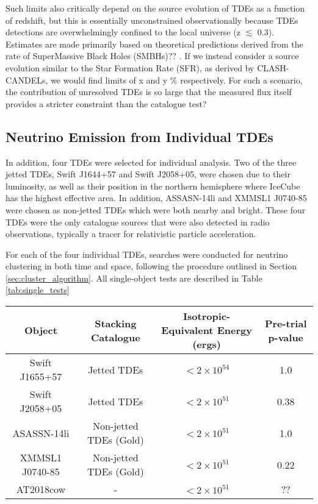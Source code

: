 Such limits also critically depend on the source evolution of TDEs as a function of redshift, but this is essentially unconstrained observationally because TDEs detections are overwhelmingly confined to the local universe (z $\lesssim$ 0.3). Estimates are made primarily based on theoretical predictions derived from the rate of SuperMassive Black Holes (SMBHs)?? \cite{Sun:2015bda}. If we instead consider a source evolution similar to the Star Formation Rate (SFR), as derived by CLASH-CANDELs, we would find limits of x and y \% respectively. For such a scenario, the contribution of unresolved TDEs is so large that the measured flux itself provides a stricter constraint than the catalogue test?

\subsection{Neutrino Emission from Individual TDEs}

In addition, four TDEs were selected for individual analysis. Two of the three jetted TDEs, Swift J1644+57 and Swift J2058+05, were chosen due to their luminosity, as well as their position in the northern hemisphere where IceCube has the highest effective area. In addition, ASSASN-14li and  XMMSL1 J0740-85 were chosen as non-jetted TDEs which were both nearby and bright. These four TDEs were the only catalogue sources that were also detected in radio observations, typically a tracer for relativistic particle acceleration.

For each of the four individual TDEs, searches were conducted for neutrino clustering in both time and space, following the procedure outlined in Section  \ref{sec:cluster_algorithm}. All single-object tests are described in Table \ref{tab:single_tests}

\begin{table*}[]
	\centering
	\begin{tabular}{||c c c| c |} 
		\hline
		Object & Stacking Catalogue &  Isotropic-Equivalent Energy (ergs) & Pre-trial p-value\\ [0.5ex] 
		\hline\hline
		Swift J1655+57 & Jetted TDEs & $<2 \times 10^{54}$ & 1.0\\ 
		\hline
		Swift J2058+05 & Jetted TDEs & $<2 \times 10^{51}$& 0.38\\
		\hline
		ASASSN-14li & Non-jetted TDEs (Gold) & $<2 \times 10^{51}$& 1.0\\
		\hline
		XMMSL1 J0740-85 & Non-jetted TDEs (Gold)& $<2 \times 10^{51}$ & 0.22\\
		\hline
		\hline
		AT2018cow & - & $<2 \times 10^{51}$& ??\\
		[1ex] 
		\hline
	\end{tabular}
	\caption{Summary of the five individual TDEs for which the temporal-cluster-search method was applied. All but AT2018cow were included in the stacking analysis.}
	\label{tab:single_tests}
\end{table*}{}

